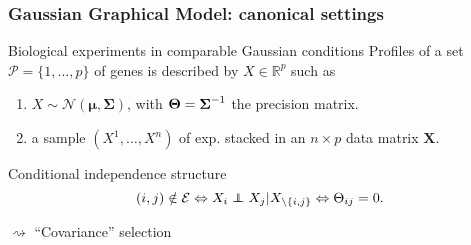 \begin{frame}
  \frametitle{Gaussian Graphical Model: canonical settings}

  \begin{block}{Biological experiments in comparable Gaussian conditions}
    Profiles  of  a set  $\mathcal{P}  =  \{1,\dots,p\}$  of genes  is
    described by $X\in\mathbb{R}^p$ such as
    \begin{enumerate}
    \item  $X\sim\mathcal{N}(\boldsymbol\mu,\boldsymbol\Sigma)$,  with
      $\boldsymbol\Theta = \boldsymbol{\Sigma}^{-1}$ the precision matrix.
    \item a sample $(X^1, \dots, X^n)$ of exp. stacked in an $n\times
      p$ data matrix $\mathbf{X}$.
    \end{enumerate}
  \end{block}

  \begin{overlayarea}{\textwidth}{\textheight}
        
        \begin{block}{Conditional independence structure}
          \vspace{-.5cm}
          \begin{equation*}
            (i,j)  \notin  \mathcal{E}  \Leftrightarrow  X_i  \indep  X_j  |
            X_{\backslash \{i,j\}} \Leftrightarrow \Theta_{ij} = 0.
          \end{equation*}
        \end{block}
        
        \vspace{-.5cm}
        \vspace{-1cm}
        $\rightsquigarrow$ \alert{``Covariance'' selection}
   
  \end{overlayarea}      
\end{frame}

